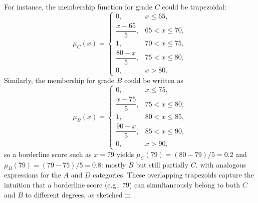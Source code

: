 For instance, the membership function for grade \(C\) could be trapezoidal:
\[
\mu_C(x) = \begin{cases}
0, & x \leq 65, \\
\dfrac{x - 65}{5}, & 65 < x \leq 70, \\
1, & 70 < x \leq 75, \\
\dfrac{80 - x}{5}, & 75 < x \leq 80, \\
0, & x > 80.
\end{cases}
\]
Similarly, the membership for grade \(B\) could be written as
\[
\mu_B(x) = \begin{cases}
0, & x \leq 75, \\
\dfrac{x - 75}{5}, & 75 < x \leq 80, \\
1, & 80 < x \leq 85, \\
\dfrac{90 - x}{5}, & 85 < x \leq 90, \\
0, & x > 90,
\end{cases}
\]
so a borderline score such as \(x=79\) yields \(\mu_C(79)=(80-79)/5=0.2\) and \(\mu_B(79)=(79-75)/5=0.8\): mostly \(B\) but still partially \(C\).
with analogous expressions for the \(A\) and \(D\) categories. These overlapping trapezoids capture the intuition that a borderline score (e.g., \(79\)) can simultaneously belong to both \(C\) and \(B\) to different degrees, as sketched in .
